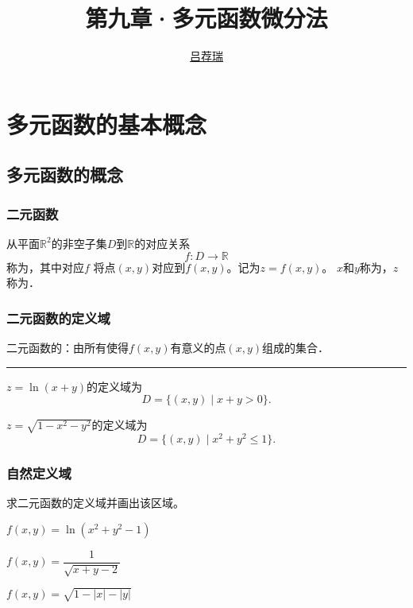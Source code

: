 \documentclass[14pt,notheorems,leqno,xcolor={rgb}]{beamer} %
\begin{document}

\title{第九章·多元函数微分法}
\author{\href{https://lvjr.bitbucket.io}{吕荐瑞}}

\begin{frame}[plain]
\titlepage
\end{frame}

\section{多元函数的基本概念}

\subsection{多元函数的概念}

\begin{frame}
\frametitle{二元函数}
\begin{definition}
从平面$\mathbb{R}^2$的非空子集$D$到$\mathbb{R}$的对应关系
$$f:D\longrightarrow\mathbb{R}$$
称为，其中对应$f$ 将点$(x,y)$对应到$f(x,y)$。记为$z=f(x,y)$。
\pause $x$和$y$称为，$z$称为．
\end{definition}
\end{frame}

\begin{frame}
\frametitle{二元函数的定义域}
二元函数的：由所有使得$f(x,y)$有意义的点$(x,y)$组成的集合．
\ppause\vspace{1em}\hrule\vspace{1em}
\begin{example}
$z=\ln(x+y)$的定义域为
$$D=\{(x,y) \mid x+y>0\}.$$
\end{example}
\pause
\begin{example}
$z=\sqrt{1-x^2-y^2}$的定义域为
$$D=\{(x,y) \mid x^2+y^2\leq1\}.$$
\end{example}
\end{frame}

\begin{frame}
\frametitle{自然定义域}
\begin{exercise}
求二元函数的定义域并画出该区域。
\begin{enumlite}
  \item $f(x,y)=\ln(x^2+y^2-1)$
  \item $f(x,y)=\dfrac1{\sqrt{x+y-2}}$
  \pause
  \item $f(x,y)=\sqrt{1-|x|-|y|}$
\end{enumlite}
\end{exercise}
\end{frame}
\end{document}

